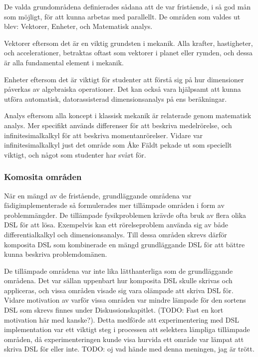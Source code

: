 \begin{binge}
  De valda grundområdena definierades sådana att de var fristående, i
  så god mån som möjligt, för att kunna arbetas med parallellt. De
  områden som valdes ut blev: Vektorer, Enheter, och Matematisk
  analys.

  Vektorer eftersom det är en viktig grundsten i mekanik. Alla krafter,
  hastigheter, och accelerationer, betraktas oftast som vektorer i
  planet eller rymden, och dessa är alla fundamental element i
  mekanik.

  Enheter eftersom det är viktigt för studenter att förstå sig på hur
  dimensioner påverkas av algebraiska operationer. Det kan också vara
  hjälpsamt att kunna utföra automatisk, datorassisterad
  dimensionsanalys på ens beräkningar.

  Analys eftersom alla koncept i klassisk mekanik är relaterade genom
  matematisk analys. Mer specifikt används differenser för att beskriva
  medelrörelse, och infinitesimalkalkyl för att beskriva
  momentanrörelser. Vidare var infinitesimalkalkyl just det område som
  Åke Fäldt pekade ut som speciellt viktigt, och något som studenter har
  svårt för.


  
  \subsubsection{Komosita områden}
  
    När en mängd av de fristående, grundläggande områdena var
    fädigimplementerade så formulerades mer tillämpade områden i form
    av problemmängder. De tillämpade fysikproblemen krävde ofta bruk
    av flera olika DSL för att lösa. Exempelvis kan ett rörelseproblem
    använda sig av både differentialkalkyl och dimensionsanalys.  Till
    dessa områden skrevs därför komposita DSL som kombinerade en mängd
    grundläggande DSL för att bättre kunna beskriva problemdomänen.

    De tillämpade områdena var inte lika lätthanterliga som de
    grundläggande områdena. Det var sällan uppenbart hur komposita DSL
    skulle skrivas och appliceras, och vissa områden visade sig vara
    olämpade att skriva DSL för. Vidare motivation av varför vissa
    områden var mindre lämpade för den sortens DSL som skrevs finnes
    under Diskussionskapitlet. (TODO: Fast en kort motivation här med
    kanske?). Detta medförde att experimentering med DSL
    implementation var ett viktigt steg i processen att selektera lämpliga
    tillämpade områden, då experimenteringen kunde visa hurvida ett område
    var lämpat att skriva DSL för eller inte. TODO: oj vad hände med
    denna meningen, jag är trött.



\end{binge}
